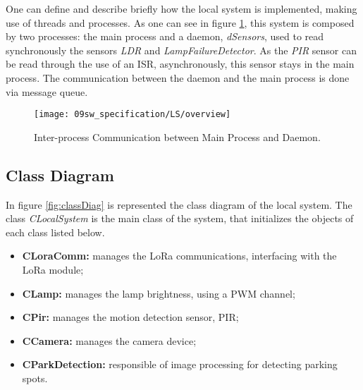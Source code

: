 One can define and describe briefly how the local system is implemented, making use of threads and processes. As one can see in figure \ref{fig:task_overview}, this system is composed by two processes: the main process and a daemon, \textit{dSensors}, used to read synchronously the sensors \textit{LDR} and \textit{LampFailureDetector}. As the \textit{PIR} sensor can be read through the use of an ISR, asynchronously, this sensor stays in the main process. The communication between the daemon and the main process is done via message queue.

\begin{figure}[H]
	\centering
	\texttt{[image: 09sw\_specification/LS/overview]}
	\caption{Inter-process Communication between Main Process and Daemon.}
	\label{fig:task_overview}
\end{figure}

\subsection{Class Diagram}
In figure \ref{fig:classDiag} is represented the class diagram of the local system. The class \textit{CLocalSystem} is the main class of the system, that initializes the objects of each class listed below.

\begin{itemize}
	\item \textbf{CLoraComm:} manages the LoRa communications, interfacing with the LoRa module;
	\item \textbf{CLamp:} manages the lamp brightness, using a PWM channel;	
	\item \textbf{CPir:} manages the motion detection sensor, PIR;
	\item \textbf{CCamera:} manages the camera device;
	\item \textbf{CParkDetection:} responsible of image processing for detecting parking spots.
\end{itemize}

